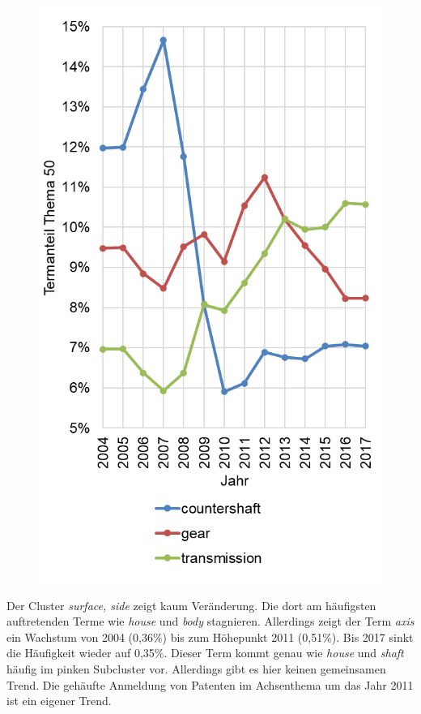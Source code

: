 \begin{figure}[!ht]
\begin{floatrow}
{			\includegraphics[width=\linewidth,keepaspectratio=true]{img/DLDA_topic_50.png}
		}
	\end{floatrow}
\end{figure}

Der Cluster \emph{surface, side} zeigt kaum Veränderung. Die dort am häufigsten auftretenden Terme wie \emph{house} und \emph{body} stagnieren. Allerdings zeigt der Term \emph{axis} ein Wachstum von 2004 (0,36\%) bis zum Höhepunkt 2011 (0,51\%). Bis 2017 sinkt die Häufigkeit wieder auf 0,35\%. Dieser Term kommt genau wie \emph{house} und \emph{shaft} häufig im pinken Subcluster vor. Allerdings gibt es hier keinen gemeinsamen Trend. Die gehäufte Anmeldung von Patenten im Achsenthema um das Jahr 2011 ist ein eigener Trend.



